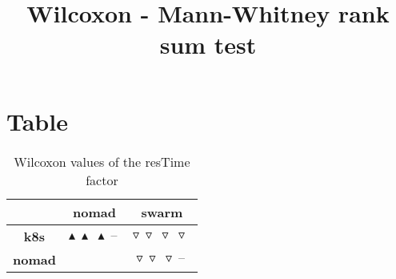 \documentclass{article}
\title{Wilcoxon - Mann-Whitney rank sum test}
\author{}
\begin{document}
\maketitle
\section{Table}
\begin{table}[!htp]
  \caption{Wilcoxon values of the resTime factor}
  \label{table:resTime}
  \centering
  \begin{scriptsize}
  \begin{tabular}{c|cc}
      & \textbf{nomad} & \textbf{swarm} \\\hline
      \textbf{k8s} & $\blacktriangle\ \blacktriangle\ \blacktriangle\ \text{--}\  $ & $ \triangledown\ \triangledown\ \triangledown\ \triangledown\ $ \\
      \textbf{nomad} & $ $ & $ \triangledown\ \triangledown\ \triangledown\ \text{--}\ $ \\
  \end{tabular}
  \end{scriptsize}
\end{table}
\end{document}

